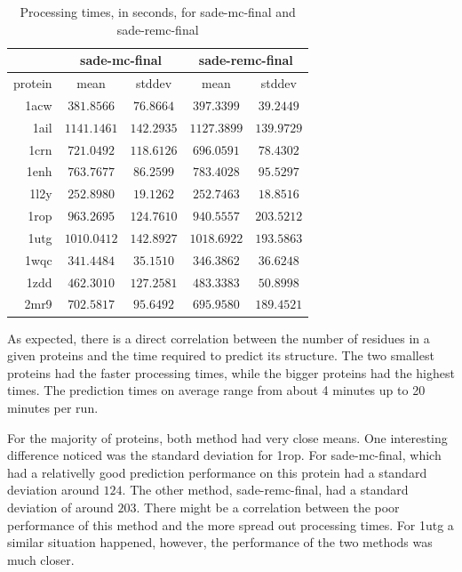 \begin{table}
  \centering
  \begin{tabular}{r|c|c||c|c}
            & \multicolumn{2}{c}{sade-mc-final} & \multicolumn{2}{||c}{sade-remc-final} \\ \hline
    protein & mean & stddev & mean & stddev \\ \hline \hline
    1acw & $ 381.8566$ & $ 76.8664$ & $ 397.3399$ & $ 39.2449$ \\ \hline
    1ail & $1141.1461$ & $142.2935$ & $1127.3899$ & $139.9729$ \\ \hline
    1crn & $ 721.0492$ & $118.6126$ & $ 696.0591$ & $ 78.4302$ \\ \hline
    1enh & $ 763.7677$ & $ 86.2599$ & $ 783.4028$ & $ 95.5297$ \\ \hline
    1l2y & $ 252.8980$ & $ 19.1262$ & $ 252.7463$ & $ 18.8516$ \\ \hline
    1rop & $ 963.2695$ & $124.7610$ & $ 940.5557$ & $203.5212$ \\ \hline
    1utg & $1010.0412$ & $142.8927$ & $1018.6922$ & $193.5863$ \\ \hline
    1wqc & $ 341.4484$ & $ 35.1510$ & $ 346.3862$ & $ 36.6248$ \\ \hline
    1zdd & $ 462.3010$ & $127.2581$ & $ 483.3383$ & $ 50.8998$ \\ \hline
    2mr9 & $ 702.5817$ & $ 95.6492$ & $ 695.9580$ & $189.4521$ \\ \hline
  \end{tabular}
  \caption{Processing times, in seconds, for sade-mc-final and sade-remc-final}
  \label{tab:processing-times}
\end{table}

As expected, there is a direct correlation between the number of residues in a
given proteins and the time required to predict its structure. The two smallest
proteins had the faster processing times, while the bigger proteins had the
highest times. The prediction times on average range from about 4 minutes up to
20 minutes per run.

For the majority of proteins, both method had very close means. One interesting
difference noticed was the standard deviation for 1rop. For sade-mc-final,
which had a relativelly good prediction performance on this protein had
a standard deviation around $124$. The other method, sade-remc-final, had a
standard deviation of around $203$. There might be a correlation between the
poor performance of this method and the more spread out processing times.
For 1utg a similar situation happened, however, the performance of the two
methods was much closer.

